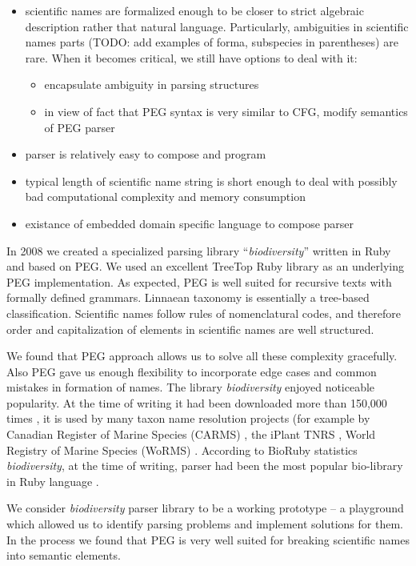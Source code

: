 \documentclass{bmcart}
\begin{document}
\begin{itemize}
  \item scientific names are formalized enough to be closer to strict
  algebraic description rather that natural language. Particularly,
  ambiguities in scientific names parts (TODO:  add examples of forma,
  subspecies in parentheses) are rare. When it becomes critical, we still have
  options to deal with it:
    \begin{itemize}
      \item encapsulate ambiguity in parsing structures
      \item in view of fact that PEG syntax is very similar to CFG, modify
      semantics of PEG parser
    \end{itemize}
  \item parser is relatively easy to compose and program
  \item typical length of scientific name string is short enough to deal with
  possibly bad computational complexity and memory consumption
  \item existance of embedded domain specific language to compose parser
\end{itemize}

In 2008 we created a specialized parsing library ``\textit{biodiversity}''
\cite{biodiversity} written in Ruby and based on PEG. We used an excellent
TreeTop Ruby library \cite{treetop} as an underlying PEG implementation. As
expected, PEG is well suited for recursive texts with formally defined
grammars. Linnaean taxonomy is essentially a tree-based classification.
Scientific names follow rules of nomenclatural codes, and therefore order and
capitalization of elements in scientific names are well structured.

We found that PEG approach allows us to solve all these complexity gracefully.
Also PEG gave us enough flexibility to incorporate edge cases and common
mistakes in formation of names. The library \textit{biodiversity} enjoyed
noticeable popularity. At the time of writing it had been downloaded more than
150,000 times \cite{bdiv_downloads}, it is used by many taxon name resolution
projects (for example by Canadian Register of Marine Species (CARMS)
\cite{carms}, the iPlant TNRS \cite{iplant}, World Registry of Marine Species
(WoRMS) \cite{worms}.  According to BioRuby statistics \textit{biodiversity},
at the time of writing, parser had been the most popular bio-library in Ruby
language \cite{biogems}.

We consider \textit{biodiversity} parser library to be a working prototype --
a playground which allowed us to identify parsing problems and implement
solutions for them. In the process we found that PEG is very well suited for
breaking scientific names into semantic elements.
\end{document}
